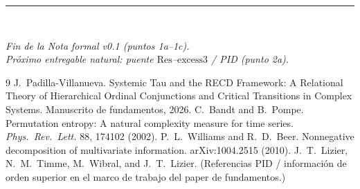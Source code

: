 \documentclass[11pt,a4paper]{article}
\theoremstyle{definition}
\theoremstyle{plain}
\theoremstyle{remark}
\newcommand{\Res}{\mathrm{Res}}
\newcommand{\excess}{\mathrm{excess3}}
\begin{document}
\vspace{1.5em}
\noindent\rule{\textwidth}{0.4pt}\\[0.5em]
\begin{center}
\em Fin de la Nota formal v0.1 (puntos 1a--1c).\\
Pr\'oximo entregable natural: puente $\Res$--$\excess$ / PID (punto 2a).
\end{center}

\begin{thebibliography}{9}
J.~Padilla-Villanueva.
\newblock Systemic Tau and the RECD Framework: A Relational Theory of
Hierarchical Ordinal Conjunctions and Critical Transitions in Complex
Systems.
\newblock Manuscrito de fundamentos, 2026.
C.~Bandt and B.~Pompe.
\newblock Permutation entropy: A natural complexity measure for time
series.
\newblock \emph{Phys.\ Rev.\ Lett.} 88, 174102 (2002).
P.~L.~Williams and R.~D.~Beer.
\newblock Nonnegative decomposition of multivariate information.
\newblock arXiv:1004.2515 (2010).
J.~T.~Lizier, N.~M.~Timme, M.~Wibral, and J.~T.~Lizier.
\newblock (Referencias PID / informaci\'on de orden superior en el
marco de trabajo del paper de fundamentos.)
\end{thebibliography}
\end{document}
